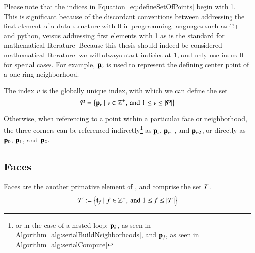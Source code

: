 Please note that the indices in Equation~\ref{eq:defineSetOfPoints} begin with 1. This is significant because of the discordant conventions between addressing the first element of a data structure with 0 in programming languages such as C++ and python, versus addressing first elements with 1 as is the standard for mathematical literature. Because this thesis should indeed be considered mathematical literature, we will always start indicies at 1, and only use index 0 for special cases. For example, $\mathbf{p}_0$ is used to represent the defining center point of a one-ring neighborhood.

The index $v$ is the globally unique index, with which we can define the set
\begin{equation}
	\mathcal{P} = \left \{\mathbf{p}_v \mid v \in \mathbb{Z}^+, \;\text{and}\; 1\leq v \leq|\mathcal{P}| \right \}
	\label{eq:defineSetOfPoints}
\end{equation}%
%
%
%

Otherwise,
 when referencing to a point within a particular face or neighborhood, the three corners can be referenced indirectly\footnote{or in the case of a nested loop: $\mathbf{p}_k$, as seen in Algorithm~\ref{alg:serialBuildNeighborhoods}, and $\mathbf{p}_j$, as seen in Algorithm~\ref{alg:serialCompute}} as $\mathbf{p}_i$, $\bp_{\sipo}$, and $\bp_{\sipt}$, or directly as $\mathbf{p}_0$, $\mathbf{p}_1$, and $\mathbf{p}_2$.%
%
%
~\cite[p.~25]{Mara12}%

%
\subsection{Faces}
\label{chBsF}
Faces are the another primative element of \tdd{}, and comprise the set $\mathcal{T}$.
\begin{equation}
	\mathcal{T} := \left \{\mathbf{t}_f \mid f \in \mathbb{Z}^+, \;\text{and}\; 1\leq f \leq|\mathcal{T}| \right \}
	\label{eq:defineSetOfFaces}
\end{equation}%
%
%
%

